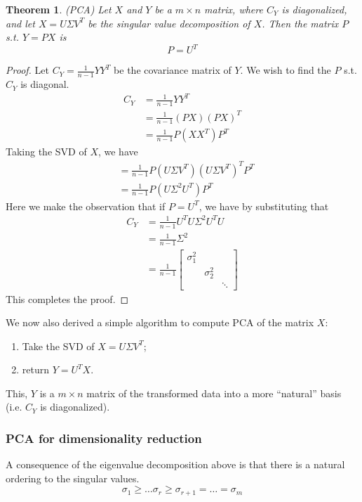 \documentclass[11pt]{article}
\newtheorem{theorem}{Theorem}[section]
\begin{document}
\begin{theorem}
\emph{(PCA)}
\label{PCA}
Let $X$ and $Y$ be a $m \times n$ matrix, where $C_Y$ is diagonalized, and let $X = U \Sigma V^T$ be the singular value decomposition of $X$. Then the matrix $P$ s.t. $Y = PX$ is
\[P = U^T\]
\end{theorem}
\begin{proof}
Let $C_Y = \frac{1}{n-1}YY^T$ be the covariance matrix of $Y$. We wish to find the $P$ s.t. $C_Y$ is diagonal.
\begin{align*}
C_Y &= \frac{1}{n-1}YY^T \\
&= \frac{1}{n-1} (PX)(PX)^T \\
&= \frac{1}{n-1} P(XX^T)P^T
\end{align*}
Taking the SVD of $X$, we have
\begin{align*}
&= \frac{1}{n-1} P(U \Sigma V^T)(U \Sigma V^T)^TP^T \\
&= \frac{1}{n-1} P (U \Sigma^2 U^T) P^T
\end{align*}
Here we make the observation that if $P = U^T$, we have by substituting that
\begin{align*}
C_Y &= \frac{1}{n-1} U^TU \Sigma^2 U^TU \\
&= \frac{1}{n-1} \Sigma^2 \\
&= \frac{1}{n-1} \begin{bmatrix} \sigma_1^2 & & \\ & \sigma_2^2 & \\ & & \ddots \end{bmatrix}
\end{align*}
This completes the proof.
\end{proof}

We now also derived a simple algorithm to compute PCA of the matrix $X$:
\begin{enumerate}
\item Take the SVD of $X = U \Sigma V^T$;
\item return $Y = U^TX$.
\end{enumerate}
This, $Y$ is a $m \times n$ matrix of the transformed data into a more ``natural'' basis (i.e. $C_Y$ is diagonalized).

\subsubsection*{PCA for dimensionality reduction}
A consequence of the eigenvalue decomposition above is that there is a natural ordering to the singular values.
\[\sigma_1 \ge \ldots \sigma_r \ge \sigma_{r+1} = \ldots = \sigma_{m}\]
\end{document}
